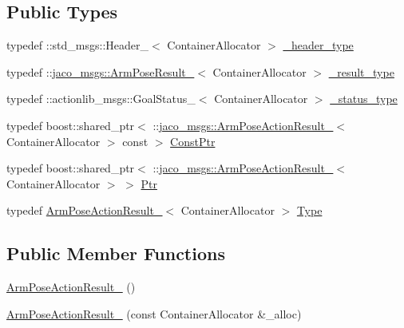 \subsection*{Public Types}
\begin{DoxyCompactItemize}
\item 
typedef \+::std\+\_\+msgs\+::\+Header\+\_\+$<$ Container\+Allocator $>$ \hyperlink{structjaco__msgs_1_1ArmPoseActionResult___accf60f842d4109bd135b54bf14456fe0}{\+\_\+header\+\_\+type}
\item 
typedef \+::\hyperlink{structjaco__msgs_1_1ArmPoseResult__}{jaco\+\_\+msgs\+::\+Arm\+Pose\+Result\+\_\+}$<$ Container\+Allocator $>$ \hyperlink{structjaco__msgs_1_1ArmPoseActionResult___ae000110dfd7c7cf641eb12b4e92cdfa9}{\+\_\+result\+\_\+type}
\item 
typedef \+::actionlib\+\_\+msgs\+::\+Goal\+Status\+\_\+$<$ Container\+Allocator $>$ \hyperlink{structjaco__msgs_1_1ArmPoseActionResult___a3bcda59a5c50ad41670c134e22ea1013}{\+\_\+status\+\_\+type}
\item 
typedef boost\+::shared\+\_\+ptr$<$ \+::\hyperlink{structjaco__msgs_1_1ArmPoseActionResult__}{jaco\+\_\+msgs\+::\+Arm\+Pose\+Action\+Result\+\_\+}$<$ Container\+Allocator $>$ const  $>$ \hyperlink{structjaco__msgs_1_1ArmPoseActionResult___a10c17bbc2a08b9e273ec87170c93f67e}{Const\+Ptr}
\item 
typedef boost\+::shared\+\_\+ptr$<$ \+::\hyperlink{structjaco__msgs_1_1ArmPoseActionResult__}{jaco\+\_\+msgs\+::\+Arm\+Pose\+Action\+Result\+\_\+}$<$ Container\+Allocator $>$ $>$ \hyperlink{structjaco__msgs_1_1ArmPoseActionResult___afbccfc911b64352d0819c403defeaa7a}{Ptr}
\item 
typedef \hyperlink{structjaco__msgs_1_1ArmPoseActionResult__}{Arm\+Pose\+Action\+Result\+\_\+}$<$ Container\+Allocator $>$ \hyperlink{structjaco__msgs_1_1ArmPoseActionResult___af116ac3287100b4a819a2e5f032a55f8}{Type}
\end{DoxyCompactItemize}
\subsection*{Public Member Functions}
\begin{DoxyCompactItemize}
\item 
\hyperlink{structjaco__msgs_1_1ArmPoseActionResult___ad31f343e441695a3db8677d029304973}{Arm\+Pose\+Action\+Result\+\_\+} ()
\item 
\hyperlink{structjaco__msgs_1_1ArmPoseActionResult___ae7631171e12687602112d4e632fb51ce}{Arm\+Pose\+Action\+Result\+\_\+} (const Container\+Allocator \&\+\_\+alloc)
\end{DoxyCompactItemize}
